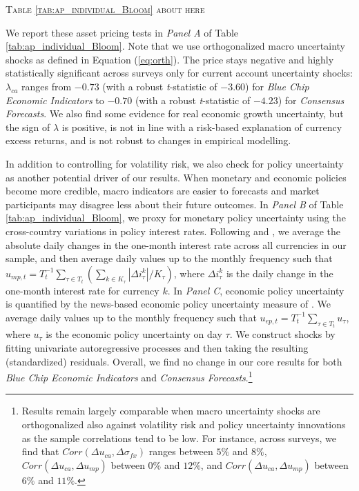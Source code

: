 \begin{center}
	\textsc{Table \ref{tab:ap_individual_Bloom} about here}
\end{center}

We report these asset pricing tests in \emph{Panel A} of Table \ref{tab:ap_individual_Bloom}. Note that we use orthogonalized macro uncertainty shocks as defined in Equation (\ref{eq:orth}). The price stays negative and highly statistically significant across surveys only for current account uncertainty shocks: $\lambda_{ca}$ ranges from $-0.73$ (with a robust \emph{t}-statistic of $-3.60$) for \emph{Blue Chip Economic Indicators} to $-0.70$ (with a robust \emph{t}-statistic of $-4.23$) for \emph{Consensus Forecasts}. We also find some evidence for real economic growth uncertainty, but the sign of $\lambda$ is positive, is not in line with a risk-based explanation of currency excess returns, and is not robust to changes in empirical modelling.

In addition to controlling for volatility risk, we also check for policy uncertainty as another potential driver of our results. When monetary and economic policies become more credible, macro indicators are easier to forecasts and market participants may disagree less about their future outcomes. In \emph{Panel B} of Table \ref{tab:ap_individual_Bloom}, we proxy for monetary policy uncertainty using the cross-country variations in policy interest rates. Following \citet{DFS_2012} and \citet{menkhoff_etal2012}, we average the absolute daily changes in the one-month interest rate across all currencies in our sample, and then average daily values up to the monthly frequency such that $u_{mp,t} = T_{t}^{-1}\sum_{\tau \in T_{t}}(\sum_{k\in K_{\tau}} |\Delta i^{k}_{\tau}|/K_{\tau})$, where $\Delta i^{k}_{\tau}$ is the daily change in the one-month interest rate for currency $k$.  In \emph{Panel C}, economic policy uncertainty is quantified by the news-based economic policy uncertainty measure of \citet{Baker/Bloom/Davis:2013}. We average daily values up to the monthly frequency such that $u_{ep,t} = T_{t}^{-1}\sum_{\tau \in T_{t}}u_{\tau}$, where $u_{\tau}$ is the economic policy uncertainty on day $\tau$.  We construct shocks by fitting univariate autoregressive processes and then taking the resulting (standardized) residuals. Overall, we find no change in our core results for both \emph{Blue Chip Economic Indicators} and \emph{Consensus Forecasts}.\footnote{Results remain largely comparable when macro uncertainty shocks are orthogonalized also against volatility risk and policy uncertainty innovations as the sample correlations tend to be low. For instance, across surveys, we find that $Corr(\Delta u_{ca}, \Delta \sigma_{fx})$ ranges between $5\%$ and $8\%$, $Corr(\Delta u_{ca}, \Delta u_{mp})$ between $0\%$ and $12\%$, and $Corr(\Delta u_{ca}, \Delta u_{mp})$ between $6\%$ and $11\%$.}


